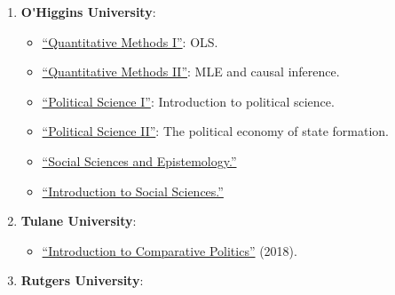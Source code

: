 \begin{enumerate}

\item {\bf O\'\unskip Higgins University}:
  
    \begin{itemize}
      \item[\textcolor{gray}{\textbullet}] \href{https://github.com/hbahamonde/OLS/raw/master/Bahamonde_OLS.pdf}{``Quantitative Methods I''}: {\color{gray}OLS}.
      \item[\textcolor{gray}{\textbullet}] \href{https://github.com/hbahamonde/MLE/raw/master/Bahamonde_MLE.pdf}{``Quantitative Methods II''}: {\color{gray}MLE and causal inference}.
      \item[\textcolor{gray}{\textbullet}] \href{https://github.com/hbahamonde/Ciencia_Politica_I/raw/master/Bahamonde_Ciencia_Politica_I.pdf}{``Political Science I''}: {\color{gray} Introduction to political science}.
      \item[\textcolor{gray}{\textbullet}] \href{https://github.com/hbahamonde/Ciencia_Politica_II/raw/master/Bahamonde_Ciencia_Politica_II.pdf}{``Political Science II''}: {\color{gray} The political economy of state formation}.
      \item[\textcolor{gray}{\textbullet}] \href{https://github.com/hbahamonde/Social_Sciences_Epistemology_UGRAD/raw/master/Bahamonde_Social_Sciences_Epistemology_UGRAD_Syllabus.pdf}{``Social Sciences and Epistemology.''}
      \item[\textcolor{gray}{\textbullet}] \href{https://github.com/hbahamonde/Intro_Ciencias_Sociales/raw/master/Bahamonde_Intro_Ciencias_Sociales.pdf}{``Introduction to Social Sciences.''}
    \end{itemize}

\item {\bf Tulane University}:
  
    \begin{itemize}
      \item[\textcolor{gray}{\textbullet}] \href{https://github.com/hbahamonde/Comparative_Politics_UGRAD/raw/master/Bahamonde_Comparative_Politics_Syllabus_UGRAD.pdf}{``Introduction to Comparative Politics''} (2018).
    \end{itemize}

\item {\bf Rutgers University}:


\end{enumerate}
